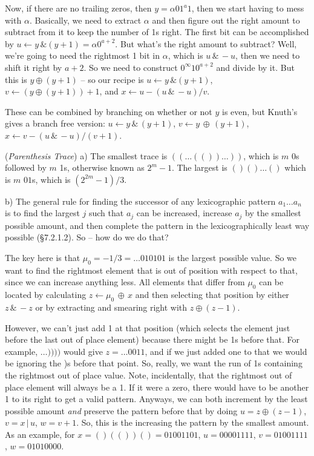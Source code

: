 Now, if there are no trailing zeros, then $y = \alpha 0 1^a 1$, then
we start having to mess with $\alpha$.  Basically, we need to 
extract $\alpha$ and then figure out the right amount to subtract from it
to keep the number of 1s right.  The first bit can be accomplished by $u \gets y \, \&
\left(y + 1\right) = \alpha 0^{a+2}$.  But what's the
right amount to subtract?  Well, we're going to need the rightmost
1 bit in $\alpha$, which is $u \, \& \, -u$, then we need to shift it right by
$a + 2$.  So we need to construct $0^{\infty} 1 0^{a+2}$ and divide by it.
But this is $y \oplus \left(y + 1\right)$ -- so our recipe is
$u \gets y \, \& \left(y + 1\right)$, $v \gets \left(y \oplus \left(y + 1\right)\right) + 1$,
and $x \gets u - \left(u \, \& \, -u\right) / v$.

These can be combined by branching on whether or not $y$ is even, but
Knuth's gives a branch free version: $u \gets y \, \& \, \left(y + 1\right)$, 
$v \gets  y \, \oplus \, \left(y + 1\right)$,
$x \gets v - \left(u \, \& \, -u\right) / \left( v + 1 \right)$.

\vskip 0.08in ({\it Parenthesis Trace})\hfil\break
a) The smallest trace is $(( \ldots (()) \ldots )) $, which is $m$ 0s followed
by $m$ 1s, otherwise known as $2^m-1$.  The largest is $()()\ldots()$ which 
is $m$ $01$s, which is $\left(2^{2m}-1\right)/3$.

\noindent b) The general rule for finding the successor of any lexicographic 
pattern $a_1 \ldots a_n$ is to find the largest $j$ such that $a_j$ can be increased, increase
$a_j$ by the smallest possible amount, and then complete the pattern
in the lexicographically least way possible (\S7.2.1.2).  So -- how do we do that?

The key here is that $\mu_0 =  -1/3 = \ldots010101$ is the largest possible value.  
So we want to find the rightmost element that is out of position with respect to that, since
we can increase anything less.  All elements that differ from $\mu_0$
can be located by calculating $z \gets \mu_0 \, \oplus \, x$ and then selecting
that position by either $z \, \& \, -z$ or by extracting and smearing right with
$z \oplus \left(z - 1\right)$.

However, we can't just add 1 at that position (which selects 
the element just before the last out of place element) because there might be 1s 
before that.  For example, $\ldots))))$ would give $z = \ldots 0011$,
and if we just added one to that we would be ignoring the )s before
that point.  So, really, we want the run of 1s containing the rightmost out 
of place value.  Note, incidentally, that the rightmost
out of place element will always be a 1. If it were a zero, there
would have to be another 1 to its right to get a valid pattern.
Anyways, we can both increment by the least possible amount
{\it and} preserve the pattern before that by doing 
$u = z \oplus \left(z - 1\right)$, $v = x\, |\, u$, $w = v + 1$.
So, this is the increasing the pattern by the smallest amount.
As an example, for $x = ()(())() = 01001101$, $u = 00001111$,
$v = 01001111$, $w = 01010000$.

